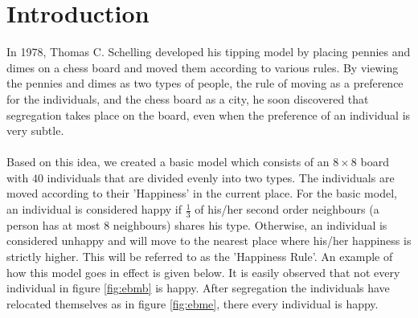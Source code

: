 \section{Introduction}
In 1978, Thomas C. Schelling developed his tipping model by placing pennies and dimes on a chess board and moved them according to various rules. 
By viewing the pennies and dimes as two types of people, the rule of moving as a preference for the individuals, and the chess board as a city, he soon discovered that segregation takes place on the board, even when the preference of an individual is very subtle.\\
\\
Based on this idea, we created a basic model which consists of an $8\times8$ board with $40$ individuals that are divided evenly into two types. 
The individuals are moved according to their 'Happiness' in the current place. 
For the basic model, an individual is considered happy if $\frac{1}{3}$ of his/her second order neighbours (a person has at most $8$ neighbours) shares his type. 
Otherwise, an individual is considered unhappy and will move to the nearest place where  his/her happiness is strictly higher. This will be referred to as the 'Happiness Rule'. 
An example of how this model goes in effect is given below. It is easily observed that not every individual in figure \ref{fig:ebmb} is happy. After segregation the individuals have relocated themselves as in figure \ref{fig:ebme}, there every individual is happy.

